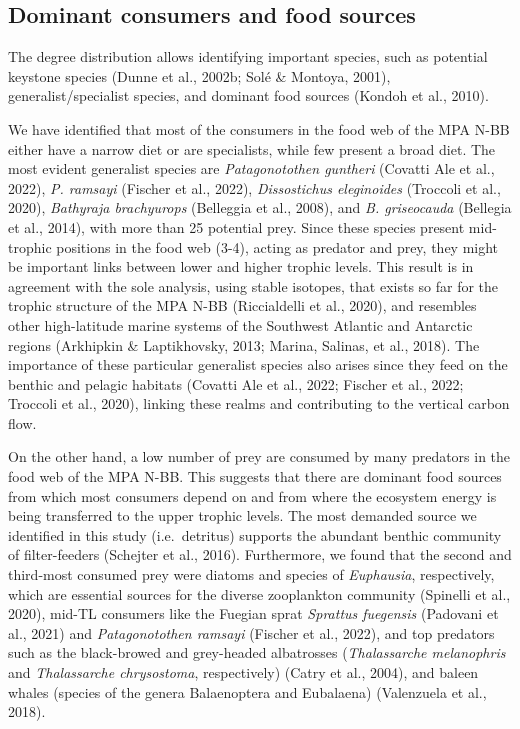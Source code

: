 \documentclass[preprint, 3p,
authoryear]{elsarticle} %
\begin{document}
\hypertarget{dominant-consumers-and-food-sources}{%
\subsection{Dominant consumers and food
sources}\label{dominant-consumers-and-food-sources}}

The degree distribution allows identifying important species, such as
potential keystone species (Dunne et al., 2002b; Solé \& Montoya, 2001),
generalist/specialist species, and dominant food sources (Kondoh et al.,
2010).

We have identified that most of the consumers in the food web of the MPA
N-BB either have a narrow diet or are specialists, while few present a
broad diet. The most evident generalist species are \emph{Patagonotothen
guntheri} (Covatti Ale et al., 2022), \emph{P. ramsayi} (Fischer et al.,
2022), \emph{Dissostichus eleginoides} (Troccoli et al., 2020),
\emph{Bathyraja brachyurops} (Belleggia et al., 2008), and \emph{B.
griseocauda} (Bellegia et al., 2014), with more than 25 potential prey.
Since these species present mid-trophic positions in the food web (3-4),
acting as predator and prey, they might be important links between lower
and higher trophic levels. This result is in agreement with the sole
analysis, using stable isotopes, that exists so far for the trophic
structure of the MPA N-BB (Riccialdelli et al., 2020), and resembles
other high-latitude marine systems of the Southwest Atlantic and
Antarctic regions (Arkhipkin \& Laptikhovsky, 2013; Marina, Salinas, et
al., 2018). The importance of these particular generalist species also
arises since they feed on the benthic and pelagic habitats (Covatti Ale
et al., 2022; Fischer et al., 2022; Troccoli et al., 2020), linking
these realms and contributing to the vertical carbon flow.

On the other hand, a low number of prey are consumed by many predators
in the food web of the MPA N-BB. This suggests that there are dominant
food sources from which most consumers depend on and from where the
ecosystem energy is being transferred to the upper trophic levels. The
most demanded source we identified in this study (i.e.~detritus)
supports the abundant benthic community of filter-feeders (Schejter et
al., 2016). Furthermore, we found that the second and third-most
consumed prey were diatoms and species of \emph{Euphausia},
respectively, which are essential sources for the diverse zooplankton
community (Spinelli et al., 2020), mid-TL consumers like the Fuegian
sprat \emph{Sprattus fuegensis} (Padovani et al., 2021) and
\emph{Patagonotothen ramsayi} (Fischer et al., 2022), and top predators
such as the black-browed and grey-headed albatrosses (\emph{Thalassarche
melanophris} and \emph{Thalassarche chrysostoma}, respectively) (Catry
et al., 2004), and baleen whales (species of the genera Balaenoptera and
Eubalaena) (Valenzuela et al., 2018).
\end{document}

